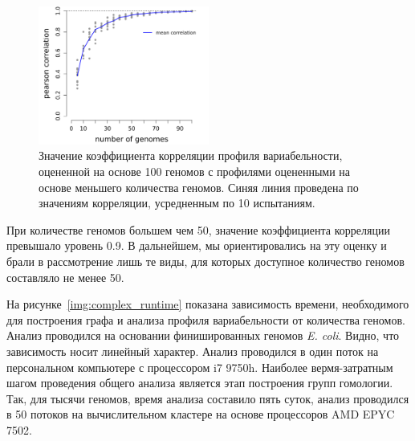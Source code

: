 \begin{figure}[!ht] 
  \center
    \includegraphics[width=0.5\textwidth]{Dissertation/images/complexity/numberOfGenomes.png}
  \caption{Значение коэффициента корреляции профиля вариабельности, оцененной на основе 100 геномов с профилями оцененными на основе меньшего количества геномов. Синяя линия проведена по значениям корреляции, усредненным по 10 испытаниям. }
  \label{img:genome_number} 
\end{figure}

При количестве геномов большем чем 50, значение коэффициента корреляции превышало уровень 0.9. В дальнейшем, мы ориентировались на эту оценку и брали в рассмотрение лишь те виды, для которых доступное количество геномов составляло не менее 50.

На рисунке~\ref{img:complex_runtime} показана зависимость времени, необходимого для построения графа и анализа профиля вариабельности от количества геномов. Анализ проводился на основании финишированных геномов \textit{E. coli}. Видно, что зависимость носит линейный характер. Анализ проводился в один поток на персональном компьютере с процессором i7 9750h. Наиболее вермя-затратным шагом проведения общего анализа является этап построения групп гомологии. Так, для тысячи геномов, время анализа составило пять суток, анализ проводился в 50 потоков на вычислительном кластере на основе процессоров AMD EPYC 7502.

